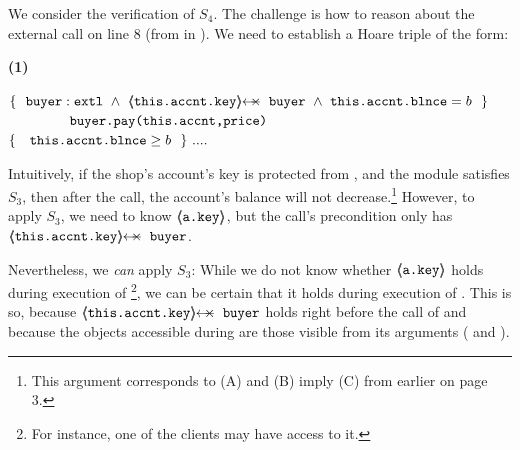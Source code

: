 We consider  the  verification of $S_4$. 
The challenge is how to reason  about the external call on line 8 (from  in ). 
We need to establish a Hoare triple of the form:

  \begin{minipage}{.05\textwidth}
   \textbf{(1)}
\end{minipage}
\hfill
\begin{minipage}{.95\textwidth}
\begin{flushleft}
$\{\  \ { \external{\prg{buyer}}} \ \wedge\ {\protectedFrom {\prg{this.\myAccount.key}} {\prg{buyer}}\ \wedge\ {\prg{this.\myAccount.\balance}}= b    }\ \  \}$\\
$\ \ \ \ \ \ \ \ \ \ \ \ {\ \prg{buyer.pay(this.accnt,price)}   \ } $\\
$  \{\  \ \  {\mbox{\normalfont{\texttt{this.\mbox{\normalfont{\texttt{accnt}}}.\mbox{\normalfont{\texttt{blnce}}}}}}} \geq  b \  \  \}\ .... $ 
\end{flushleft}
\end{minipage}
 
 \vspace{.05cm}
Intuitively, if the shop's account's key is protected from , %
 and the module satisfies $S_3$,  %
 then after the call, the account's balance will not decrease.\footnote{This argument corresponds to (A) and (B) imply (C) from earlier on page 3.} %
%
However, %
to apply $S_3$, we   need to know  ${\langle\!\!\langle \mbox{\normalfont{\texttt{a.key}}} \rangle\!\!\rangle} $,  but  the call's precondition only has $\protectedFrom{\prg{this.\myAccount.key}}{\prg{buyer}}$. 



Nevertheless, we \emph{can} apply $S_3$: While we do not know whether 
${\langle\!\!\langle \mbox{\normalfont{\texttt{a.key}}} \rangle\!\!\rangle}$ holds  %
during  execution of \footnote{For instance, one of the clients may have access to it.}, we can be certain 
that it holds during execution of .  This is so, because $\protectedFrom{\prg{this.\myAccount.key}}{\prg{buyer}}$
holds right before the call of 
and because the objects accessible during  are those visible from its arguments (\ie {} and ).

